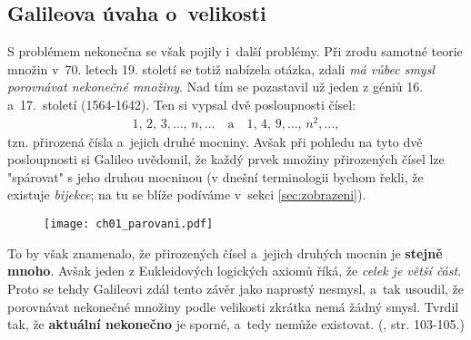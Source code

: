 \subsection{Galileova úvaha o~velikosti}\label{subsec:galileo}
S problémem nekonečna se však pojily i~další problémy. Při zrodu samotné teorie množin v~70. letech 19. století se totiž nabízela otázka, zdali \emph{má vůbec smysl porovnávat nekonečné množiny}. Nad tím se pozastavil už jeden z géniů 16. a~17.~století  \mbox{(1564-1642)}. Ten si vypsal dvě posloupnosti čísel:
\begin{align*}
1,\,2,\,3,\dots,\,n,\dots \quad \text{a} \quad 1,\,4,\,9,\dots,\,n^2,\dots ,
\end{align*}
tzn. přirozená čísla a~jejich druhé mocniny. Avšak při pohledu na tyto dvě posloupnosti si Galileo uvědomil, že každý prvek množiny přirozených čísel lze "spárovat" s jeho druhou mocninou (v dnešní terminologii bychom řekli, že existuje \emph{bijekce}; na tu se blíže podíváme v~sekci \ref{sec:zobrazeni}).
\begin{figure}[H]
	\centering
	\texttt{[image: ch01\_parovani.pdf]}
\end{figure}
To by však znamenalo, že přirozených čísel a~jejich druhých mocnin je \textbf{stejně mnoho}. Avšak jeden z Eukleidových logických axiomů říká, že \emph{celek je větší část}. Proto se tehdy Galileovi zdál tento závěr jako naprostý nesmysl, a~tak usoudil, že porovnávat nekonečné množiny podle velikosti zkrátka nemá žádný smysl. Tvrdil tak, že \textbf{aktuální nekonečno} je sporné, a~tedy nemůže existovat. (\cite{Fuchs2003}, str. 103-105.)

